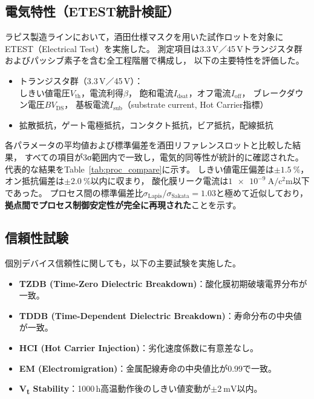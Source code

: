 \documentclass[conference]{IEEEtran}
\begin{document}
\subsection{電気特性（ETEST統計検証）}
ラピス製造ラインにおいて，酒田仕様マスクを用いた試作ロットを対象にETEST（Electrical Test）を実施した。
測定項目は3.3\,V／45\,Vトランジスタ群およびパッシブ素子を含む全工程階層で構成し，
以下の主要特性を評価した。

\begin{itemize}
  \item トランジスタ群（3.3\,V／45\,V）：\\
  しきい値電圧$V_{\mathrm{th}}$，電流利得$\beta$，
  飽和電流$I_{\mathrm{dsat}}$，オフ電流$I_{\mathrm{off}}$，
  ブレークダウン電圧$BV_{\mathrm{DS}}$，
  基板電流$I_{\mathrm{sub}}$（substrate current, Hot Carrier指標）
  \item 拡散抵抗，ゲート電極抵抗，コンタクト抵抗，ビア抵抗，配線抵抗
\end{itemize}

各パラメータの平均値および標準偏差を酒田リファレンスロットと比較した結果，
すべての項目が3σ範囲内で一致し，電気的同等性が統計的に確認された。
代表的な結果をTable~\ref{tab:proc_compare}に示す。
しきい値電圧偏差は$\pm\SI{1.5}{\percent}$，
オン抵抗偏差は$\pm\SI{2.0}{\percent}$以内に収まり，
酸化膜リーク電流は$\SI{1e-9}{\ampere\per\square\centi\meter}$以下であった。
プロセス間の標準偏差比$\sigma_{\mathrm{Lapis}} / \sigma_{\mathrm{Sakata}} = 1.03$と極めて近似しており，
\textbf{拠点間でプロセス制御安定性が完全に再現された}ことを示す。

\subsection{信頼性試験}
個別デバイス信頼性に関しても，以下の主要試験を実施した。

\begin{itemize}
  \item \textbf{TZDB (Time-Zero Dielectric Breakdown)}：酸化膜初期破壊電界分布が一致。
  \item \textbf{TDDB (Time-Dependent Dielectric Breakdown)}：寿命分布の中央値が一致。
  \item \textbf{HCI (Hot Carrier Injection)}：劣化速度係数に有意差なし。
  \item \textbf{EM (Electromigration)}：金属配線寿命の中央値比が$0.99$で一致。
  \item \textbf{V\textsubscript{t} Stability}：1000\,h高温動作後のしきい値変動が$\pm\SI{2}{\milli\volt}$以内。
\end{itemize}
\end{document}
